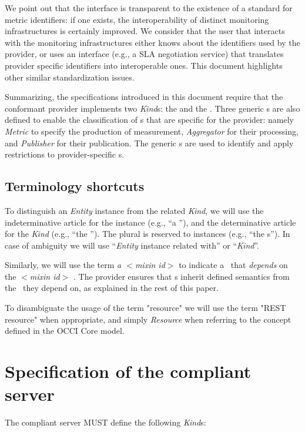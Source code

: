 \documentclass[12pt]{article}  %
\begin{document}
We point out that the interface is transparent to the existence of a standard for metric identifiers: if one exists, the interoperability of distinct monitoring infrastructures is certainly improved. We consider that the user that interacts with the monitoring infrastructures either knows about the identifiers used by the provider, or uses an interface (e.g., a SLA negotiation service) that translates provider specific identifiers into interoperable ones. This document highlights other similar standardization issues.

Summarizing, the specifications introduced in this document require that the conformant provider implements two {\em Kind}s: the {\em \coll } and the {\em \sens }. Three generic \mi s are also defined to enable the classification of \mi s that are specific for the provider: namely {\em Metric} to specify the production of measurement, {\em Aggregator} for their processing, and {\em Publisher} for their publication. The generic \mi s are used to identify and apply restrictions to provider-specific \mi s. 

\subsection{Terminology shortcuts}

To distinguish an {\em Entity} instance from the related {\em Kind}, we will use the indeterminative article for the instance (e.g., ``a \rs''), and the determinative article for the {\em Kind} (e.g., ``the \rs''). The plural is reserved to instances (e.g., ``the \rs s''). In case of ambiguity we will use ``{\em Entity} instance related with'' or ``{\em Kind}''. 

Similarly, we will use the term {\em a $<$mixin id$>$ \mi} to indicate a \mi\ that {\em depends} on the {\em $<$mixin id$>$} \mi. The provider ensures that \mi s inherit defined semantics from the \mi\ they depend on, as explained in the rest of this paper. 

To disambiguate the usage of the term "resource" we will use the term "REST resource" when appropriate, and simply {\em Resource} when referring to the concept defined in the OCCI Core model.

\section{Specification of the compliant server}

The compliant server MUST define the following {\em Kind}s:
\end{document}
